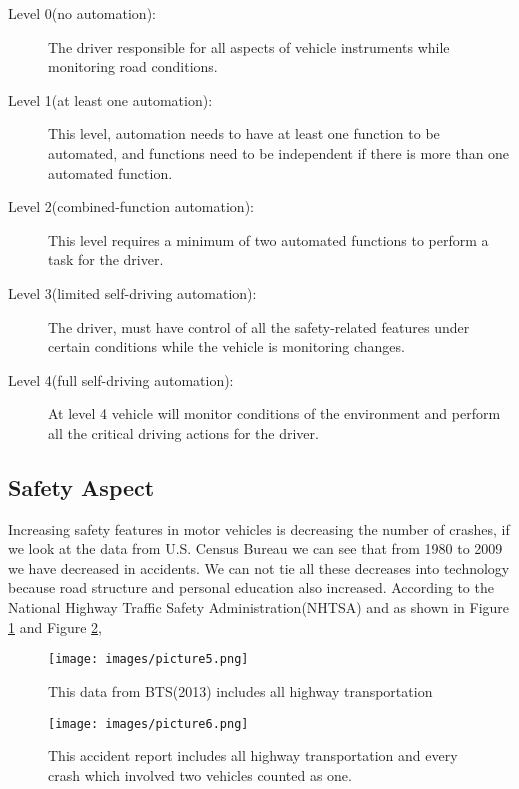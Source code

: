 \documentclass[sigconf]{acmart}
\begin{document}
\begin{description}
    \item[Level 0(no automation):] The driver responsible for all aspects of vehicle instruments while monitoring road con\-di\-ti\-ons\cite{hamzah}.
    \item[Level 1(at least one automation):] This level, automation needs to have at least one function to be automated, and functions need to be independent if there is more than one automated function\cite{hamzah}.
    \item[Level 2(combined-function automation):] This level re\-qu\-ir\-es a minimum of two automated functions to perform a task for the driver\cite{hamzah}.
    \item[Level 3(limited self-driving automation):] The driver, mu\-st have control of all the safety-related features under certain conditions while the vehicle is monitoring changes\cite{hamzah}.
    \item[Level 4(full self-driving automation):]At level 4 vehicle will monitor conditions of the environment and perform all the critical driving actions for the driver\cite{hamzah}.
\end{description}

\subsection{Safety Aspect}
Increasing safety features in motor vehicles is decreasing the number of crashes, if we look at the data from U.S. Census Bureau we can see that from 1980 to 2009 we have decreased in accidents. We can not tie all these decreases into technology because road structure and personal education also increased. According to the National Highway Traffic Safety Administration(NHTSA) and as shown in Figure \ref{fig:NHTSAaccidentreport} and Figure \ref{fig:NHTSAaccidentreport2}, 
 
 \begin{figure}[!ht]
  \centering
      \texttt{[image: images/picture5.png]}
  \caption{This data from BTS(2013) includes all highway transportation}\label{fig:NHTSAaccidentreport}
\end{figure}

 \begin{figure}[!ht]
  \centering
      \texttt{[image: images/picture6.png]}
  \caption{This accident report includes all highway transportation and every crash which involved two vehicles counted as one.}\label{fig:NHTSAaccidentreport2}
\end{figure}
\end{document}
